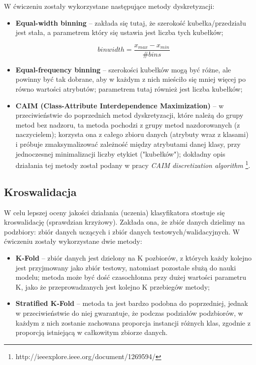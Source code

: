         \noindent
        W ćwiczeniu zostały wykorzystane następujące metody dyskretyzacji:
        \begin{itemize}
            \item{\textbf{Equal-width binning} -- zakłada się tutaj, że szerokość kubełka/przedziału jest stała,
                   a parametrem który się ustawia jest liczba tych kubełków;}

             $$ binwidth = \frac{x_{max} - x_{min}}{\#bins} $$

            \item{\textbf{Equal-frequency binning} -- szerokości kubełków mogą być różne, ale powinny być tak
                  dobrane, aby w każdym z nich mieściło się mniej więcej po równo wartości atrybutów; parametrem
                  tutaj również jest liczba kubełków;}

            \item{\textbf{CAIM (Class-Attribute Interdependence Maximization)} -- w przeciwieństwie do poprzednich
                  metod dyskretyzacji, które należą do grupy metod bez nadzoru, ta metoda pochodzi z grupy metod
                  nazdorowanych (z naczycielem); korzysta ona z całego zbioru danych (atrybuty wraz z klasami) i
                  próbuje zmaksymalizować zależność między atrybutami danej klasy, przy jednoczesnej minimalizacji
                  liczby etykiet ("kubełków"); dokładny opis działania tej metody został podany w pracy \textit{CAIM discretization algorithm} \footnote{http://ieeexplore.ieee.org/document/1269594/}.}
        \end{itemize}

    \subsection{Kroswalidacja}
        W celu lepszej oceny jakości działania (uczenia) klasyfikatora stostuje się kroswalidację (sprawdzian
        krzyżowy). Zakłada ona, że zbiór danych dzielimy na podzbiory: zbiór danych uczących i zbiór danych
        testowych/walidacyjnych. W ćwiczeniu zostały wykorzystane dwie metody:
        \begin{itemize}
            \item{\textbf{K-Fold} -- zbiór danych jest dzielony na K pozbiorów, z których każdy kolejno jest
                  przyjmowany jako zbiór testowy, natomiast pozostałe służą do nauki modelu; metoda może być
                  dość czasochłonna przy dużej wartości parametru K, jako że przeprowadzanych jest kolejno
                  K przebiegów metody;}
            \item{\textbf{Stratified K-Fold} -- metoda ta jest bardzo podobna do poprzedniej, jednak w przeciwieństwie
                  do niej gwarantuje, że podczas podziałów podzbiorów, w każdym z nich zostanie zachowana proporcja
                  instancji różnych klas, zgodnie z proporcją istniejącą w całkowitym zbiorze danych.}
        \end{itemize}

